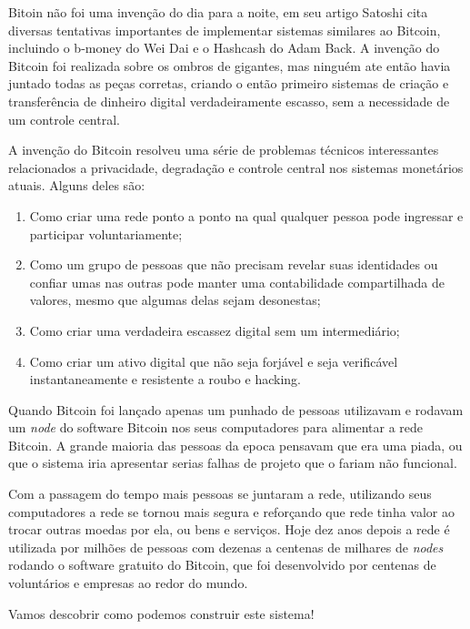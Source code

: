 Bitoin não foi uma invenção do dia para a noite, em seu artigo Satoshi cita diversas tentativas importantes de implementar sistemas similares ao Bitcoin, incluindo o b-money do Wei Dai e o Hashcash do Adam Back. A invenção do Bitcoin foi realizada sobre os ombros de gigantes, mas ninguém ate então havia juntado todas as peças corretas, criando o então primeiro sistemas de criação e transferência de dinheiro digital verdadeiramente escasso, sem a necessidade de um controle central. 

A invenção do Bitcoin resolveu uma série de problemas técnicos interessantes relacionados a privacidade, degradação e controle central nos sistemas monetários atuais. Alguns deles são:

\begin{enumerate}
\item Como criar uma rede ponto a ponto na qual qualquer pessoa pode ingressar e participar voluntariamente;
\item Como um grupo de pessoas que não precisam revelar suas identidades ou confiar umas nas outras pode manter uma contabilidade compartilhada de valores, mesmo que algumas delas sejam desonestas;
\item Como criar uma verdadeira escassez digital sem um intermediário;
\item Como criar um ativo digital que não seja forjável e seja verificável instantaneamente e resistente a roubo e hacking.
\end{enumerate}

Quando Bitcoin foi lançado apenas um punhado de pessoas utilizavam e rodavam um \textit{node} do software Bitcoin nos seus computadores para alimentar a rede Bitcoin. A grande maioria das pessoas da epoca pensavam que era uma piada, ou que o sistema iria apresentar serias falhas de projeto que o fariam não funcional. 

Com a passagem do tempo mais pessoas se juntaram a rede, utilizando seus computadores a rede se tornou mais segura e reforçando que rede tinha valor ao trocar outras moedas por ela, ou bens e serviços. Hoje dez anos depois a rede é utilizada por milhões de pessoas com dezenas a centenas de milhares de \textit{nodes} rodando o software gratuito do Bitcoin, que foi desenvolvido por centenas de voluntários e empresas ao redor do mundo.

Vamos descobrir como podemos construir este sistema!